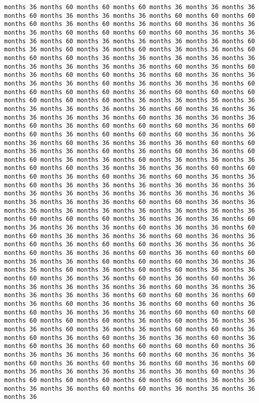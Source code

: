 \documentclass[11pt]{article}
\begin{document}
\begin{Verbatim}[commandchars=\\\{\}, frame=single, framerule=2mm, rulecolor=\color{outerrorbackground}]
months 36 months 60 months 60 months 60 months 36 months 36 months 36 months 60 months 36 months 36 months 36 months 60 months 60 months 60 months 60 months 36 months 60 months 36 months 60 months 36 months 36 months 36 months 60 months 60 months 60 months 60 months 36 months 36 months 36 months 60 months 36 months 36 months 36 months 36 months 60 months 36 months 60 months 36 months 60 months 36 months 36 months 60 months 60 months 60 months 36 months 36 months 36 months 36 months 36 months 36 months 36 months 36 months 36 months 60 months 36 months 60 months 36 months 60 months 60 months 36 months 60 months 36 months 36 months 36 months 36 months 60 months 36 months 36 months 36 months 60 months 60 months 60 months 60 months 36 months 60 months 60 months 60 months 60 months 60 months 60 months 36 months 36 months 36 months 36 months 36 months 36 months 36 months 36 months 60 months 36 months 36 months 36 months 36 months 36 months 60 months 36 months 36 months 36 months 60 months 36 months 60 months 60 months 60 months 36 months 60 months 60 months 36 months 60 months 60 months 60 months 36 months 36 months 36 months 60 months 36 months 36 months 36 months 60 months 60 months 36 months 36 months 60 months 36 months 60 months 36 months 60 months 60 months 36 months 36 months 60 months 36 months 36 months 36 months 60 months 60 months 36 months 36 months 36 months 60 months 60 months 60 months 36 months 60 months 36 months 60 months 36 months 36 months 60 months 36 months 36 months 36 months 36 months 36 months 36 months 36 months 36 months 36 months 36 months 36 months 36 months 36 months 36 months 36 months 36 months 60 months 60 months 36 months 36 months 36 months 36 months 36 months 36 months 36 months 36 months 36 months 60 months 60 months 60 months 36 months 36 months 36 months 60 months 36 months 36 months 36 months 60 months 36 months 36 months 60 months 60 months 36 months 36 months 36 months 60 months 36 months 36 months 60 months 36 months 60 months 60 months 36 months 36 months 36 months 60 months 36 months 36 months 60 months 36 months 60 months 60 months 36 months 36 months 60 months 60 months 60 months 36 months 36 months 36 months 60 months 36 months 60 months 60 months 36 months 36 months 60 months 36 months 36 months 60 months 36 months 60 months 36 months 36 months 36 months 36 months 36 months 60 months 36 months 36 months 36 months 36 months 36 months 60 months 60 months 36 months 60 months 36 months 60 months 36 months 36 months 60 months 60 months 36 months 60 months 36 months 36 months 36 months 60 months 60 months 60 months 60 months 60 months 60 months 36 months 60 months 36 months 36 months 36 months 60 months 36 months 36 months 60 months 60 months 36 months 60 months 36 months 60 months 36 months 36 months 60 months 36 months 60 months 36 months 60 months 60 months 60 months 60 months 36 months 36 months 36 months 36 months 60 months 60 months 36 months 36 months 60 months 36 months 60 months 36 months 60 months 36 months 60 months 36 months 36 months 36 months 36 months 36 months 60 months 36 months 60 months 60 months 60 months 60 months 60 months 36 months 36 months 36 months 36 months 60 months 60 months 36 months 36 months 36 months 36 
\end{Verbatim}
\end{document}
